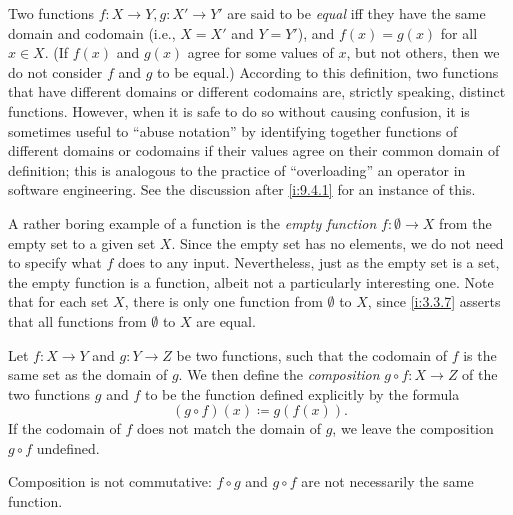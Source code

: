 \begin{defn}\label{i:3.3.7}
  Two functions \(f : X \to Y, g : X' \to Y'\) are said to be \emph{equal} iff they have the same domain and codomain (i.e., \(X = X'\) and \(Y = Y'\)), and \(f(x) = g(x)\) for all \(x \in X\).
  (If \(f(x)\) and \(g(x)\) agree for some values of \(x\), but not others, then we do not consider \(f\) and \(g\) to be equal.)
  According to this definition, two functions that have different domains or different codomains are, strictly speaking, distinct functions.
  However, when it is safe to do so without causing confusion, it is sometimes useful to ``abuse notation'' by identifying together functions of different domains or codomains if their values agree on their common domain of definition;
  this is analogous to the practice of ``overloading'' an operator in software engineering.
  See the discussion after \cref{i:9.4.1} for an instance of this.
\end{defn}

\setcounter{thm}{8}
\begin{eg}\label{i:3.3.9}
  A rather boring example of a function is the \emph{empty function} \(f : \emptyset \to X\) from the empty set to a given set \(X\).
  Since the empty set has no elements, we do not need to specify what \(f\) does to any input.
  Nevertheless, just as the empty set is a set, the empty function is a function, albeit not a particularly interesting one.
  Note that for each set \(X\), there is only one function from \(\emptyset\) to \(X\), since \cref{i:3.3.7} asserts that all functions from \(\emptyset\) to \(X\) are equal.
\end{eg}

\begin{defn}[Composition]\label{i:3.3.10}
  Let \(f : X \to Y\) and \(g : Y \to Z\) be two functions, such that the codomain of \(f\) is the same set as the domain of \(g\).
  We then define the \emph{composition} \(g \circ f : X \to Z\) of the two functions \(g\) and \(f\) to be the function defined explicitly by the formula
  \[
    (g \circ f)(x) \coloneqq g(f(x)).
  \]
  If the codomain of \(f\) does not match the domain of \(g\), we leave the composition \(g \circ f\) undefined.
\end{defn}

\begin{note}
  Composition is not commutative:
  \(f \circ g\) and \(g \circ f\) are not necessarily the same function.
\end{note}

